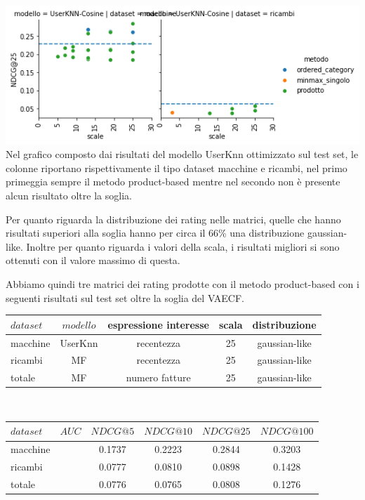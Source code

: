 \includegraphics[width=16cm]{figures/validazione_userknn.png}\\
Nel grafico composto dai risultati del modello UserKnn ottimizzato sul test set, le colonne riportano rispettivamente il tipo dataset macchine e ricambi, nel primo primeggia sempre il metodo product-based mentre nel secondo non è presente alcun risultato oltre la soglia.

Per quanto riguarda la distribuzione dei rating nelle matrici, quelle che hanno risultati superiori alla soglia hanno per circa il 66\% una distribuzione gaussian-like. Inoltre per quanto riguarda i valori della scala, i risultati migliori si sono ottenuti con il valore massimo di questa.

Abbiamo quindi tre matrici dei rating prodotte con il metodo product-based con i seguenti risultati sul test set oltre la soglia del VAECF.\\

\begin{tabular}{|l|cccc|}
    \toprule
    $dataset$  & $modello$ & espressione interesse & scala & distribuzione  \\
    \midrule
    macchine & UserKnn& recentezza & 25 & gaussian-like   \\
    ricambi & MF & recentezza & 25 & gaussian-like \\
    totale  & MF & numero fatture & 25 & gaussian-like \\
\bottomrule
\end{tabular}\\

\begin{tabular}{|l|ccccc|}
    \toprule
    $dataset$  & $AUC$ & $NDCG@5$ & $NDCG@10$  & $NDCG@25$ & $NDCG@100$  \\
    \midrule
    macchine &  & 0.1737 & 0.2223 & 0.2844 & 0.3203 \\
    ricambi &  & 0.0777 & 0.0810 & 0.0898 & 0.1428 \\
    totale  &  & 0.0776 & 0.0765 & 0.0808 & 0.1276 \\
\bottomrule
\end{tabular}\\

